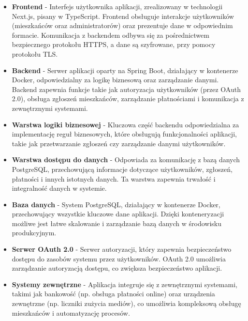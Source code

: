 \begin{itemize} 

	\item \textbf{Frontend} - Interfejs użytkownika aplikacji, zrealizowany w technologii Next.js, pisany w TypeScript. Frontend obsługuje interakcje użytkowników (mieszkańców oraz administratorów) oraz prezentuje dane w odpowiednim formacie. Komunikacja z backendem odbywa się za pośrednictwem bezpiecznego protokołu HTTPS, a dane są szyfrowane, przy pomocy protokołu TLS.

	\item \textbf{Backend} - Serwer aplikacji oparty na Spring Boot, działający w kontenerze Docker, odpowiedzialny za logikę biznesową oraz zarządzanie danymi. Backend zapewnia funkcje takie jak autoryzacja użytkowników (przez OAuth 2.0), obsługa zgłoszeń mieszkańców, zarządzanie płatnościami i komunikacja z zewnętrznymi systemami.

	\item \textbf{Warstwa logiki biznesowej} - Kluczowa część backendu odpowiedzialna za implementację reguł biznesowych, które obsługują funkcjonalności aplikacji, takie jak przetwarzanie zgłoszeń czy zarządzanie danymi użytkowników.

	\item \textbf{Warstwa dostępu do danych} - Odpowiada za komunikację z bazą danych PostgreSQL, przechowującą informacje dotyczące użytkowników, zgłoszeń, płatności i innych istotnych danych. Ta warstwa zapewnia trwałość i integralność danych w systemie.

	\item \textbf{Baza danych} - System PostgreSQL, działający w kontenerze Docker, przechowujący wszystkie kluczowe dane aplikacji. Dzięki konteneryzacji możliwe jest łatwe skalowanie i zarządzanie bazą danych w środowisku produkcyjnym.

	\item \textbf{Serwer OAuth 2.0} - Serwer autoryzacji, który zapewnia bezpieczeństwo dostępu do zasobów systemu przez użytkowników. OAuth 2.0 umożliwia zarządzanie autoryzacją dostępu, co zwiększa bezpieczeństwo aplikacji.

	\item \textbf{Systemy zewnętrzne} - Aplikacja integruje się z zewnętrznymi systemami, takimi jak bankowość (np. obsługa płatności online) oraz urządzenia zewnętrzne (np. liczniki zużycia mediów), co umożliwia kompleksową obsługę mieszkańców i automatyzację procesów.

\end{itemize}

